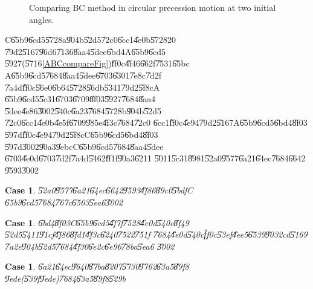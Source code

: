 \documentclass[12pt,a4paper]{article}
\newtheorem{case}[theorem]{Case}
\begin{document}
\begin{figure}[th]
\caption{Comparing BC method in circular precession motion at two initial
angles.}
\label{BC_d_5590}
\begin{center}

\end{center}
\end{figure}

C\U{65b9}\U{6cd5}\U{5728}a\U{904b}\U{52d5}\U{72c0}\U{6cc1}\U{4e0b}\U{5728}20%
\U{79d2}\U{5167}\U{96d6}\U{7136}\U{8aa4}\U{5dee}\U{6bd4}A\U{65b9}\U{6cd5}%
\U{5927}(\U{5716}\ref{ABCcompareFig})\U{ff0c}\U{4f46}\U{662f}\U{7531}\U{65bc}%
A\U{65b9}\U{6cd5}\U{7684}\U{8aa4}\U{5dee}\U{6703}\U{6301}\U{7e8c}\U{7d2f}%
\U{7a4d}\U{ff0c}\U{56e0}\U{6b64}\U{5728}\U{56db}\U{5341}\U{79d2}\U{5f8c}A%
\U{65b9}\U{6cd5}\U{5c31}\U{6703}\U{6709}\U{8f03}\U{5927}\U{7684}\U{8aa4}%
\U{5dee}\U{4e86}\U{3002}\U{540c}\U{6a23}\U{7684}\U{5728}b\U{904b}\U{52d5}%
\U{72c0}\U{6cc1}\U{4e0b}\U{4e5f}\U{6709}\U{985e}\U{4f3c}\U{7684}\U{72c0}%
\U{6cc1}\U{ff0c}\U{4e94}\U{79d2}\U{5167}A\U{65b9}\U{6cd5}\U{6bd4}\U{8f03}%
\U{597d}\U{ff0c}\U{4e94}\U{79d2}\U{5f8c}C\U{65b9}\U{6cd5}\U{6bd4}\U{8f03}%
\U{597d}\U{3002}\U{90a3}\U{9ebc}C\U{65b9}\U{6cd5}\U{7684}\U{8aa4}\U{5dee}%
\U{6703}\U{4e0d}\U{6703}\U{7d2f}\U{7a4d}\U{5462}\U{ff1f}\U{90a3}\U{6211}%
\U{5011}\U{5c31}\U{8981}\U{52a0}\U{9577}\U{6a21}\U{64ec}\U{7684}\U{6642}%
\U{9593}\U{3002}

\begin{case}
\U{52a0}\U{9577}\U{6a21}\U{64ec}\U{6642}\U{9593}\U{4f86}\U{89c0}\U{5bdf}C%
\U{65b9}\U{6cd5}\U{7684}\U{767c}\U{6563}\U{5ea6}\U{3002}
\end{case}

\begin{case}
\U{6bd4}\U{8f03}C\U{65b9}\U{6cd5}\U{4f7f}\U{7528}\U{4e0d}\U{540c}\U{8f49}%
\U{52d5}\U{5411}\U{91cf}\U{4f86}\U{8fd1}\U{4f3c}\U{6240}\U{7522}\U{751f}%
\U{7684}\U{4e0d}\U{540c}\U{ff0c}\U{53ef}\U{4ee5}\U{6539}\U{9032}cd\U{5169}%
\U{7a2e}\U{904b}\U{52d5}\U{7684}\U{4f30}\U{6e2c}\U{6e96}\U{78ba}\U{5ea6}%
\U{3002}
\end{case}

\clearpage%

\begin{case}
\U{6a21}\U{64ec}\U{9640}\U{87ba}\U{8207}\U{5730}\U{9762}\U{63a5}\U{89f8}%
\U{9ede}(\U{539f}\U{9ede})\U{7684}\U{63a5}\U{89f8}\U{529b}
\end{case}
\end{document}
